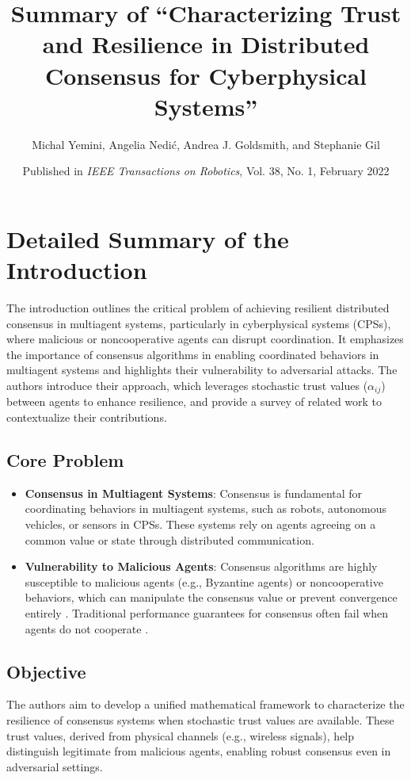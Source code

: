 \documentclass{article}
\title{Summary of ``Characterizing Trust and Resilience in Distributed Consensus for Cyberphysical Systems''}
\author{Michal Yemini, Angelia Nedić, Andrea J. Goldsmith, and Stephanie Gil}
\date{Published in \textit{IEEE Transactions on Robotics}, Vol. 38, No. 1, February 2022}
\begin{document}
\maketitle

\section*{Detailed Summary of the Introduction}
The introduction outlines the critical problem of achieving resilient distributed consensus in multiagent systems, particularly in cyberphysical systems (CPSs), where malicious or noncooperative agents can disrupt coordination. It emphasizes the importance of consensus algorithms in enabling coordinated behaviors in multiagent systems and highlights their vulnerability to adversarial attacks. The authors introduce their approach, which leverages stochastic trust values ($\alpha_{ij}$) between agents to enhance resilience, and provide a survey of related work to contextualize their contributions.

\subsection*{Core Problem}
\begin{itemize}
    \item \textbf{Consensus in Multiagent Systems}: Consensus is fundamental for coordinating behaviors in multiagent systems, such as robots, autonomous vehicles, or sensors in CPSs. These systems rely on agents agreeing on a common value or state through distributed communication.
    \item \textbf{Vulnerability to Malicious Agents}: Consensus algorithms are highly susceptible to malicious agents (e.g., Byzantine agents) or noncooperative behaviors, which can manipulate the consensus value or prevent convergence entirely \cite{ref1,ref2,ref3,ref4,ref5}. Traditional performance guarantees for consensus often fail when agents do not cooperate \cite{ref6,ref7}.
\end{itemize}

\subsection*{Objective}
The authors aim to develop a unified mathematical framework to characterize the resilience of consensus systems when stochastic trust values are available. These trust values, derived from physical channels (e.g., wireless signals), help distinguish legitimate from malicious agents, enabling robust consensus even in adversarial settings.
\end{document}
